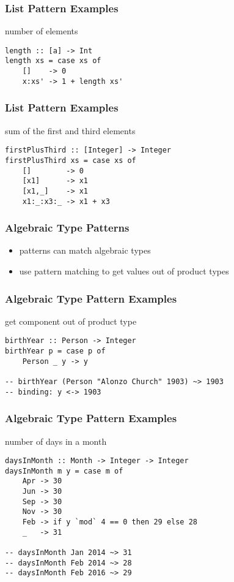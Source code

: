 \documentclass[dvipsnames]{beamer}
\theoremstyle{plain}
\begin{document}
\begin{frame}[fragile]
  \frametitle{List Pattern Examples}

  \begin{exampleblock}{number of elements}
    \begin{lstlisting}[deletekeywords={length}]
length :: [a] -> Int
length xs = case xs of
    []    -> 0
    x:xs' -> 1 + length xs'
    \end{lstlisting}
  \end{exampleblock}
\end{frame}

\begin{frame}[fragile]
  \frametitle{List Pattern Examples}

  \begin{exampleblock}{sum of the first and third elements}
    \begin{lstlisting}
firstPlusThird :: [Integer] -> Integer
firstPlusThird xs = case xs of
    []        -> 0
    [x1]      -> x1
    [x1,_]    -> x1
    x1:_:x3:_ -> x1 + x3
    \end{lstlisting}
  \end{exampleblock}
\end{frame}

\begin{frame}
  \frametitle{Algebraic Type Patterns}

  \begin{itemize}
    \item patterns can match algebraic types
    \item use pattern matching to get values out of product types
  \end{itemize}
\end{frame}

\begin{frame}[fragile]
  \frametitle{Algebraic Type Pattern Examples}

  \begin{exampleblock}{get component out of product type}
    \begin{lstlisting}
birthYear :: Person -> Integer
birthYear p = case p of
    Person _ y -> y

-- birthYear (Person "Alonzo Church" 1903) ~> 1903
-- binding: y <-> 1903
    \end{lstlisting}
  \end{exampleblock}
\end{frame}

\begin{frame}[fragile]
  \frametitle{Algebraic Type Pattern Examples}

  \begin{exampleblock}{number of days in a month}
    \begin{lstlisting}
daysInMonth :: Month -> Integer -> Integer
daysInMonth m y = case m of
    Apr -> 30
    Jun -> 30
    Sep -> 30
    Nov -> 30
    Feb -> if y `mod` 4 == 0 then 29 else 28
    _   -> 31

-- daysInMonth Jan 2014 ~> 31
-- daysInMonth Feb 2014 ~> 28
-- daysInMonth Feb 2016 ~> 29
    \end{lstlisting}
  \end{exampleblock}
\end{frame}
\end{document}
